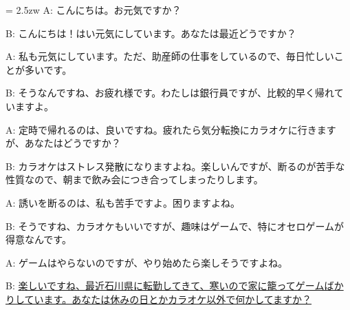 \documentclass[11pt]{amsart}
\title{}
\author{}
\newenvironment{hangall}[1]{\hangindent = 2.5zw\everypar{\hangindent = 2.5zw}}{}
\begin{document}
\maketitle
\begin{hangall}{}%
A: こんにちは。お元気ですか？

B: こんにちは！はい元気にしています。あなたは最近どうですか？

A: 私も元気にしています。ただ、助産師の仕事をしているので、毎日忙しいことが多いです。

B: そうなんですね、お疲れ様です。わたしは銀行員ですが、比較的早く帰れていますよ。

A: 定時で帰れるのは、良いですね。疲れたら気分転換にカラオケに行きますが、あなたはどうですか？

B: カラオケはストレス発散になりますよね。楽しいんですが、断るのが苦手な性質なので、朝まで飲み会につき合ってしまったりします。

A: 誘いを断るのは、私も苦手ですよ。困りますよね。

B: そうですね、カラオケもいいですが、趣味はゲームで、特にオセロゲームが得意なんです。

A: ゲームはやらないのですが、やり始めたら楽しそうですよね。

B: \ul{楽しいですね、最近石川県に転勤してきて、寒いので家に籠ってゲームばかりしています。あなたは休みの日とかカラオケ以外で何かしてますか？}\end{hangall}
\end{document}
